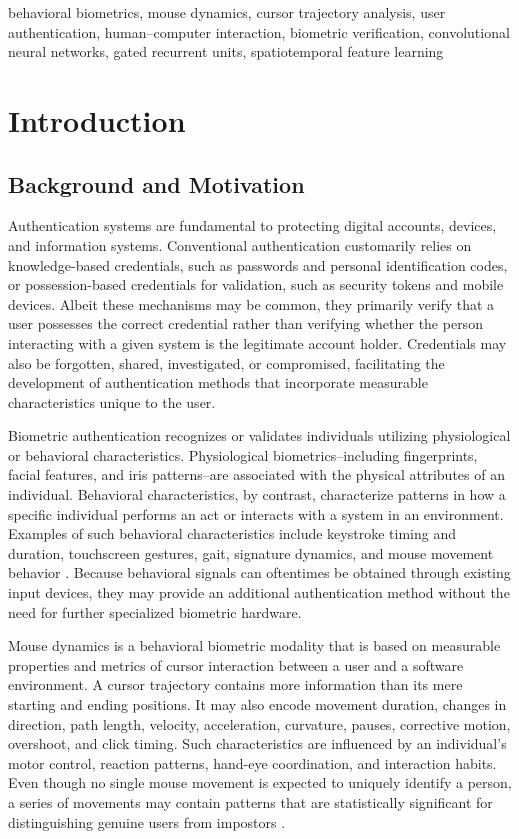 \documentclass[conference]{IEEEtran}
\begin{document}
\begin{IEEEkeywords}
behavioral biometrics, mouse dynamics, cursor trajectory analysis, user authentication, human--computer interaction, biometric verification,  convolutional neural networks, gated recurrent units, spatiotemporal feature learning
\end{IEEEkeywords}

\section{Introduction}

\subsection{Background and Motivation}
Authentication systems are fundamental to protecting digital accounts, devices, and information systems. Conventional authentication customarily relies on knowledge-based credentials, such as passwords and personal identification codes, or possession-based credentials for validation, such as security tokens and mobile devices. Albeit these mechanisms may be common, they primarily verify that a user possesses the correct credential rather than verifying whether the person interacting with a given system is the legitimate account holder. Credentials may also be forgotten, shared, investigated, or compromised, facilitating the development of authentication methods that incorporate measurable characteristics unique to the user. 

Biometric authentication recognizes or validates individuals utilizing physiological or behavioral characteristics. Physiological biometrics--including fingerprints, facial features, and iris patterns--are associated with the physical attributes of an individual. Behavioral characteristics, by contrast, characterize patterns in how a specific individual performs an act or interacts with a system in an environment. Examples of such behavioral characteristics include keystroke timing and duration, touchscreen gestures, gait, signature dynamics, and mouse movement behavior \cite{nistBiometrics, khanMouseSurvey}. Because behavioral signals can oftentimes be obtained through existing input devices, they may provide an additional authentication method without the need for further specialized biometric hardware. 

Mouse dynamics is a behavioral biometric modality that is based on measurable properties and metrics of cursor interaction between a user and a software environment. A cursor trajectory contains more information than its mere starting and ending positions. It may also encode movement duration, changes in direction, path length, velocity, acceleration, curvature, pauses, corrective motion, overshoot, and click timing. Such characteristics are influenced by an individual's motor control, reaction patterns, hand-eye coordination, and interaction habits. Even though no single mouse movement is expected to uniquely identify a person, a series of movements may contain patterns that are statistically significant for distinguishing genuine users from impostors \cite{khanMouseSurvey,deutschmannContinuousAuthentication}.
\end{document}
